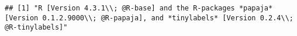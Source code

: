 \documentclass[
  man]{apa6}
\begin{document}
\newpage

\begin{verbatim}
## [1] "R [Version 4.3.1\\; @R-base] and the R-packages *papaja* [Version 0.1.2.9000\\; @R-papaja], and *tinylabels* [Version 0.2.4\\; @R-tinylabels]"
\end{verbatim}
\end{document}
